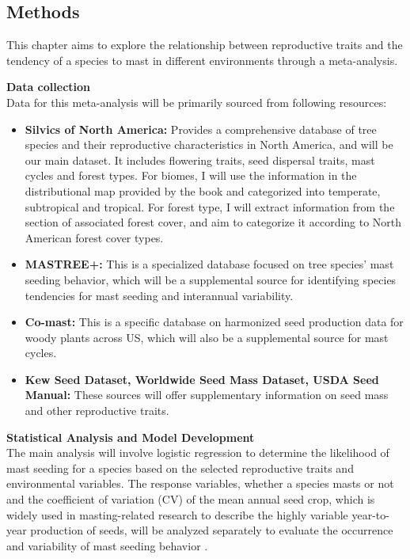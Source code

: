 \documentclass[11pt,letter]{article}
\begin{document}
\subsection{Methods}
This chapter aims to explore the relationship between reproductive traits and the tendency of a species to mast in different environments through a meta-analysis.\par
\textbf{Data collection}\\
Data for this meta-analysis will be primarily sourced from following resources:
	\begin{itemize}
	\item \textbf{Silvics of North America:} Provides a comprehensive database of tree species and their reproductive characteristics in North America, and will be our main dataset. It includes flowering traits, seed dispersal traits, mast cycles and forest types. For biomes, I will use the information in the distributional map provided by the book and categorized into temperate, subtropical and tropical. For forest type, I will extract information from the section of associated forest cover, and aim to categorize it according to North American forest cover types.
	\item \textbf{MASTREE+:} This is a specialized database focused on tree species' mast seeding behavior, which will be a supplemental source for identifying species tendencies for mast seeding and interannual variability.
	\item \textbf{Co-mast:} This is a specific database on harmonized seed production data for woody plants across US, which will also be a supplemental source for mast cycles.
	\item \textbf{Kew Seed Dataset, Worldwide Seed Mass Dataset, USDA Seed Manual:} These sources will offer supplementary information on seed mass and other reproductive traits.
	\end{itemize}
\textbf{Statistical Analysis and Model Development}\\
The main analysis will involve logistic regression to determine the likelihood of mast seeding for a species based on the selected reproductive traits and environmental variables. The response variables, whether a species masts or not and the coefficient of variation (CV) of the mean annual seed crop,  which is widely used in masting-related research to describe the highly variable year-to-year production of seeds, will be analyzed separately to evaluate the occurrence and variability of mast seeding behavior \citep{kelly2002mast}.\par
\end{document}

